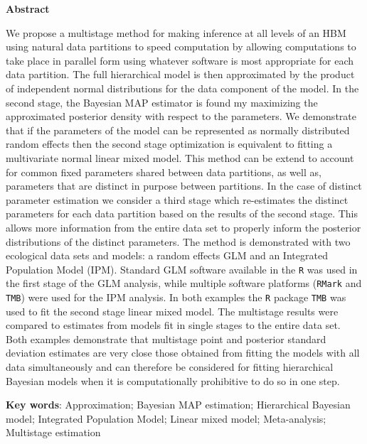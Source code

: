 \documentclass[12pt]{article}
\begin{document}
\vspace*{\fill}
\begin{center}
\begin{minipage}{0.65\paperwidth}
\renewcommand{\baselinestretch}{1}\normalsize

\centerline{\bf Abstract} 
We propose a multistage method for making inference at all levels of an HBM using natural data partitions to speed computation by allowing computations to take place in parallel form using whatever software is most appropriate for each data partition. The full hierarchical model is then approximated by the product of independent normal distributions for the data component of the model. In the second stage, the Bayesian MAP estimator is found my maximizing the approximated posterior density with respect to the parameters. We demonstrate that if the parameters of the model can be represented as normally distributed random effects then the second stage optimization is equivalent to fitting a multivariate normal linear mixed model. This method can be extend to account for common fixed parameters shared between data partitions, as well as, parameters that are distinct in purpose between partitions. In the case of distinct parameter estimation we consider a third stage which re-estimates the distinct parameters for each data partition based on the results of the second stage. This allows more information from the entire data set to properly inform the posterior distributions of the distinct parameters. The method is demonstrated with two ecological data sets and models: a random effects GLM and an Integrated Population Model (IPM). Standard GLM software available in the {\tt R} was used in the first stage of the GLM analysis, while multiple software platforms ({\tt RMark} and {\tt TMB}) were used for the IPM analysis. In both examples the {\tt R} package {\tt TMB} was used to fit the second stage linear mixed model. The multistage results were compared to estimates from models fit in single stages to the entire data set. Both examples demonstrate that multistage point and posterior standard deviation estimates are very close those obtained from fitting the models with all data simultaneously and can therefore be considered for fitting hierarchical Bayesian models when it is computationally prohibitive to do so in one step.     

\bigskip

{\bf Key words}: Approximation; Bayesian MAP estimation; Hierarchical Bayesian model; Integrated Population Model; Linear mixed model; Meta-analysis; Multistage estimation
\end{minipage}
\end{center}
\end{document}
